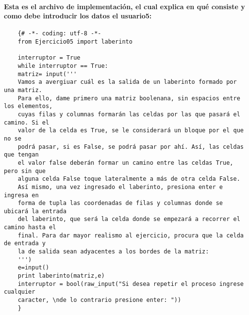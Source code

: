 \documentclass[letterpaper, 12pt, oneside]{article} %
\begin{document}
	\paragraph{Esta es el archivo de implementación, el cual explica en qué consiste y como debe introducir los datos el usuario5:}
	\begin{verbatim}
	{# -*- coding: utf-8 -*-
	from Ejercicio05 import laberinto
	
	interruptor = True
	while interruptor == True:
	matriz= input('''
	Vamos a avergiuar cuál es la salida de un laberinto formado por una matriz.
	Para ello, dame primero una matriz boolenana, sin espacios entre los elementos,
	cuyas filas y columnas formarán las celdas por las que pasará el camino. Si el
	valor de la celda es True, se le considerará un bloque por el que no se
	podrá pasar, si es False, se podrá pasar por ahí. Así, las celdas que tengan
	el valor false deberán formar un camino entre las celdas True, pero sin que
	alguna celda False toque lateralmente a más de otra celda False.
	Así mismo, una vez ingresado el laberinto, presiona enter e ingresa en
	forma de tupla las coordenadas de filas y columnas donde se ubicará la entrada
	del laberinto, que será la celda donde se empezará a recorrer el camino hasta el
	final. Para dar mayor realismo al ejercicio, procura que la celda de entrada y
	la de salida sean adyacentes a los bordes de la matriz:
	''')
	e=input()
	print laberinto(matriz,e)
	interruptor = bool(raw_input("Si desea repetir el proceso ingrese cualquier 
	caracter, \nde lo contrario presione enter: "))
	}
	\end{verbatim}
\end{document}

